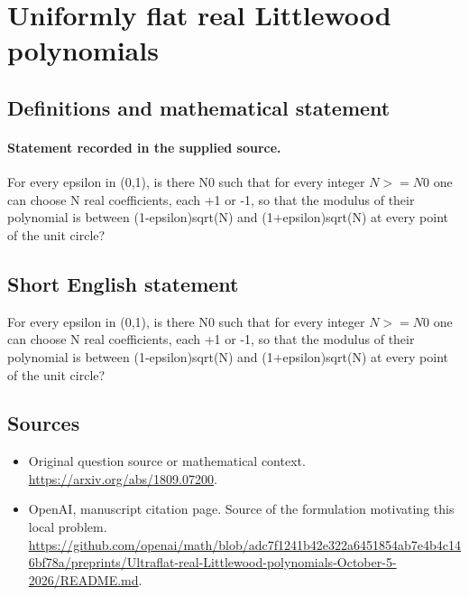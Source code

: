 \documentclass[11pt]{article}
\begin{document}
\section*{Uniformly flat real Littlewood polynomials}\label{statement}
\subsection{Definitions and mathematical statement}
\paragraph{Statement recorded in the supplied source.}
For every epsilon in (0,1), is there N0 such that for every integer $N>=N0$ one can choose N real coefficients, each +1 or -1, so that the modulus of their polynomial is between (1-epsilon)sqrt(N) and (1+epsilon)sqrt(N) at every point of the unit circle?
\subsection{Short English statement}
For every epsilon in (0,1), is there N0 such that for every integer $N>=N0$ one can choose N real coefficients, each +1 or -1, so that the modulus of their polynomial is between (1-epsilon)sqrt(N) and (1+epsilon)sqrt(N) at every point of the unit circle?
\subsection{Sources}
\begin{itemize}
\item[S1] Original question source or mathematical context.
\url{https://arxiv.org/abs/1809.07200}.
\item[S2] OpenAI, manuscript citation page. Source of the formulation motivating this local problem.
\url{https://github.com/openai/math/blob/adc7f1241b42e322a6451854ab7e4b4c146bf78a/preprints/Ultraflat-real-Littlewood-polynomials-October-5-2026/README.md}.
\end{itemize}
\end{document}
